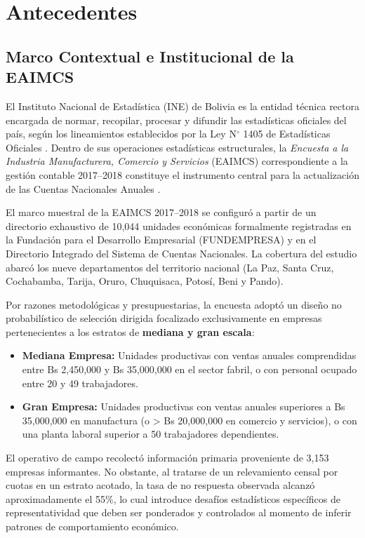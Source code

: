 \section{Antecedentes}
\label{sec:antecedentes}

\subsection{Marco Contextual e Institucional de la EAIMCS}
El Instituto Nacional de Estadística (INE) de Bolivia es la entidad técnica rectora encargada de normar, recopilar, procesar y difundir las estadísticas oficiales del país, según los lineamientos establecidos por la Ley N$^\circ$ 1405 de Estadísticas Oficiales \citep{ley1405}. Dentro de sus operaciones estadísticas estructurales, la \textit{Encuesta a la Industria Manufacturera, Comercio y Servicios} (EAIMCS) correspondiente a la gestión contable 2017--2018 constituye el instrumento central para la actualización de las Cuentas Nacionales Anuales \citep{ine2019eaimcs}.

El marco muestral de la EAIMCS 2017--2018 se configuró a partir de un directorio exhaustivo de 10,044 unidades económicas formalmente registradas en la Fundación para el Desarrollo Empresarial (FUNDEMPRESA) y en el Directorio Integrado del Sistema de Cuentas Nacionales. La cobertura del estudio abarcó los nueve departamentos del territorio nacional (La Paz, Santa Cruz, Cochabamba, Tarija, Oruro, Chuquisaca, Potosí, Beni y Pando). 

Por razones metodológicas y presupuestarias, la encuesta adoptó un diseño no probabilístico de selección dirigida focalizado exclusivamente en empresas pertenecientes a los estratos de \textbf{mediana y gran escala}:
\begin{itemize}
    \item \textbf{Mediana Empresa:} Unidades productivas con ventas anuales comprendidas entre Bs 2,450,000 y Bs 35,000,000 en el sector fabril, o con personal ocupado entre 20 y 49 trabajadores.
    \item \textbf{Gran Empresa:} Unidades productivas con ventas anuales superiores a Bs 35,000,000 en manufactura (o > Bs 20,000,000 en comercio y servicios), o con una planta laboral superior a 50 trabajadores dependientes.
\end{itemize}

El operativo de campo recolectó información primaria proveniente de 3,153 empresas informantes. No obstante, al tratarse de un relevamiento censal por cuotas en un estrato acotado, la tasa de no respuesta observada alcanzó aproximadamente el 55\%, lo cual introduce desafíos estadísticos específicos de representatividad que deben ser ponderados y controlados al momento de inferir patrones de comportamiento económico.

